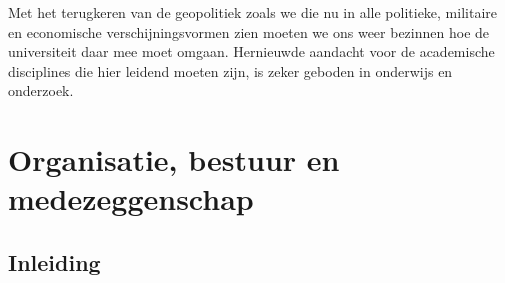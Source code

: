 \documentclass{jote-book}
\begin{document}
	Met het terugkeren van de geopolitiek zoals we die nu in alle politieke, militaire en economische verschijningsvormen zien moeten we ons weer bezinnen hoe de universiteit daar mee moet omgaan. Hernieuwde aandacht voor de academische disciplines die hier leidend moeten zijn, is zeker geboden in onderwijs en onderzoek.







	\chapter{Organisatie, bestuur en medezeggenschap}



















	\section{Inleiding}
\end{document}
